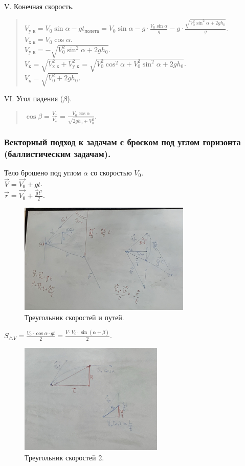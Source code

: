 \documentclass{article}
\begin{document}
	V. Конечная скорость. \\
	\begin{quote}
		$V_{\text{y к}} = V_0 \sin\alpha - gt_{\text{полета}} = V_0 \sin\alpha - g \cdot \frac{V_0 \sin\alpha}{g} - g \cdot \frac{\sqrt{V_0^2 \sin^2\alpha + 2gh_0}}{g}$. \\
		$V_{\text{x к}} = V_0 \cos\alpha$. \\
		$V_{\text{y к}} = -\sqrt{V_0^2 \sin^2\alpha + 2gh_0}$. \\
		$V_{\text{к}} = \sqrt{V_{\text{x к}}^2 + V_{\text{y к}}^2} = \sqrt{V_0^2 \cos^2\alpha + V_0^2 \sin^2\alpha + 2gh_0}$. \\
		$V_{\text{к}} = \sqrt{V_0^2 + 2gh_0}$. \\
	\end{quote}
	VI. Угол падения ($\beta$). \\
	\begin{quote}
		$\cos\beta = \frac{V_x}{V_{\text{к}}} = \frac{V_0 \cos\alpha}{\sqrt{2gh_0 + V_0^2}}$.
	\end{quote}
	\subsubsection{Векторный подход к задачам с броском под углом горизонта (баллистическим задачам).}
	Тело брошено под углом $\alpha$ со скоростью $V_0$. \\
	$\vec{V} = \vec{V_0} + gt$. \\
	$\vec{r} = \vec{V_0} + \frac{\vec{g}t^2}{2}$.
	\begin{figure}[H]
		\includegraphics[height=200px]{extra-materials/Скорости_Вектора_1}
		\caption{Треугольник скоростей и путей.}
	\end{figure}
	$S_{\triangle V} = \frac{V_0 \cdot \cos\alpha \cdot gt}{2} = \frac{V \cdot V_0 \cdot \sin(\alpha + \beta)}{2}$.
	\begin{figure}[H]
		\includegraphics[height=200px]{extra-materials/Скорости_Вектора_2}
		\caption{Треугольник скоростей 2.}
	\end{figure}
\end{document}
